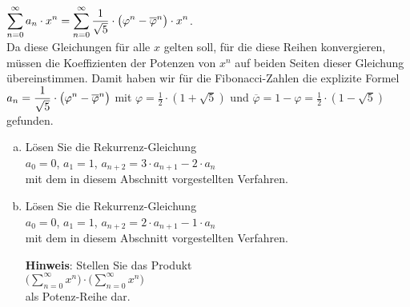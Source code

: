 $\displaystyle \sum\limits_{n=0}^\infty a_n \cdot x^n = \sum\limits_{n=0}^\infty \frac{1}{\sqrt{5}} \cdot \bigl(\varphi^n - \overline{\varphi}^n\bigr) \cdot x^n$.
\\[0.2cm]
Da diese Gleichungen f\"ur alle $x$ gelten soll, f\"ur die diese Reihen konvergieren, m\"ussen die
Koeffizienten der Potenzen von  $x^n$ auf beiden Seiten dieser Gleichung \"ubereinstimmen.  Damit
haben wir f\"ur die Fibonacci-Zahlen die explizite Formel
\\[0.2cm]
\hspace*{1.3cm}
$\displaystyle a_n = \frac{1}{\sqrt{5}} \cdot \bigl(\varphi^n - \overline{\varphi}^n\bigr)$ 
\quad mit $\varphi= \frac{1}{2} \cdot (1 + \sqrt{5})$ 
\quad und \quad  $\overline{\varphi} = 1 -\varphi = \frac{1}{2} \cdot (1 - \sqrt{5})$
\\[0.2cm]
gefunden.

\exercise
\begin{enumerate}[(a)]
\item L\"osen Sie die Rekurrenz-Gleichung
      \\[0.2cm]
      \hspace*{1.3cm}
      $a_0 = 0$, $a_1 = 1$, $a_{n+2} = 3 \cdot a_{n+1} - 2 \cdot a_n$
      \\[0.2cm]
      mit dem in diesem Abschnitt vorgestellten Verfahren.
\item L\"osen Sie die Rekurrenz-Gleichung
      \\[0.2cm]
      \hspace*{1.3cm}
      $a_0 = 0$, $a_1 = 1$, $a_{n+2} = 2 \cdot a_{n+1} - 1 \cdot a_n$
      \\[0.2cm]
      mit dem in diesem Abschnitt vorgestellten Verfahren.

      \textbf{Hinweis}:  Stellen Sie das Produkt
      \\[0.2cm]
      \hspace*{1.3cm}
      $\biggl(\sum\limits_{n=0}^\infty x^n\biggr) \cdot \biggl(\sum\limits_{n=0}^\infty x^n\biggr)$
      \\[0.2cm]
      als Potenz-Reihe dar.  \eox
\end{enumerate}

